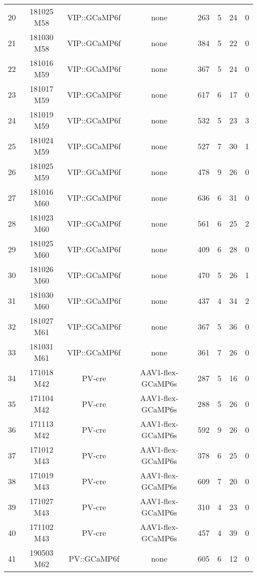 \begin{table*}[htbp]
\begin{tabular}{lccccccc}
    20    & 181025 M58 & VIP::GCaMP6f & none  & 263   & 5     & 24    & 0 \\
    21    & 181030 M58 & VIP::GCaMP6f & none  & 384   & 5     & 22    & 0 \\
    22    & 181016 M59 & VIP::GCaMP6f & none  & 367   & 5     & 24    & 0 \\
    23    & 181017 M59 & VIP::GCaMP6f & none  & 617   & 6     & 17    & 0 \\
    24    & 181019 M59 & VIP::GCaMP6f & none  & 532   & 5     & 23    & 3 \\
    25    & 181024 M59 & VIP::GCaMP6f & none  & 527   & 7     & 30    & 1 \\
    26    & 181025 M59 & VIP::GCaMP6f & none  & 478   & 9     & 26    & 0 \\
    27    & 181016 M60 & VIP::GCaMP6f & none  & 636   & 6     & 31    & 0 \\
    28    & 181023 M60 & VIP::GCaMP6f & none  & 561   & 6     & 25    & 2 \\
    29    & 181025 M60 & VIP::GCaMP6f & none  & 409   & 6     & 28    & 0 \\
    30    & 181026 M60 & VIP::GCaMP6f & none  & 470   & 5     & 26    & 1 \\
    31    & 181030 M60 & VIP::GCaMP6f & none  & 437   & 4     & 34    & 2 \\
    32    & 181027 M61 & VIP::GCaMP6f & none  & 367   & 5     & 36    & 0 \\
    33    & 181031 M61 & VIP::GCaMP6f & none  & 361   & 7     & 26    & 0 \\
    34    & 171018 M42 & PV-cre & AAV1-flex-GCaMP6s & 287   & 5     & 16    & 0 \\
    35    & 171104 M42 & PV-cre & AAV1-flex-GCaMP6s & 288   & 5     & 26    & 0 \\
    36    & 171113 M42 & PV-cre & AAV1-flex-GCaMP6s & 592   & 9     & 26    & 0 \\
    37    & 171012 M43 & PV-cre & AAV1-flex-GCaMP6s & 378   & 6     & 25    & 0 \\
    38    & 171019 M43 & PV-cre & AAV1-flex-GCaMP6s & 609   & 7     & 20    & 0 \\
    39    & 171027 M43 & PV-cre & AAV1-flex-GCaMP6s & 310   & 4     & 23    & 0 \\
    40    & 171102 M43 & PV-cre & AAV1-flex-GCaMP6s & 457   & 4     & 39    & 0 \\
    41    & 190503 M62 & PV::GCaMP6f & none  & 605   & 6     & 12    & 0 \\

\end{tabular}
\end{table*}
